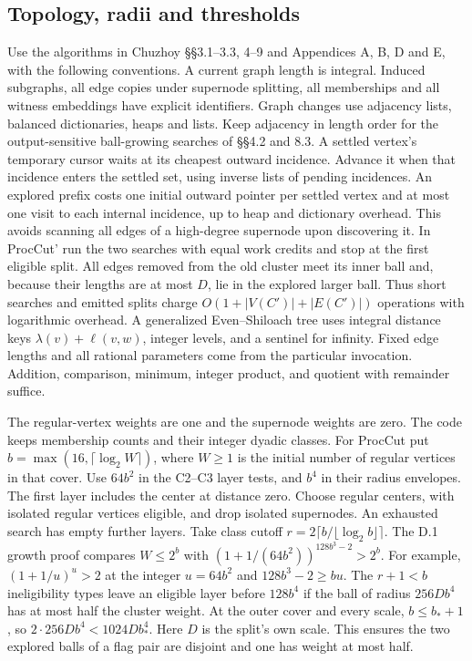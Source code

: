 \documentclass[11pt]{article}
\begin{document}
\hypertarget{topology-radii-and-thresholds}{%
\subsection{Topology, radii and thresholds}\label{topology-radii-and-thresholds}}

Use the algorithms in Chuzhoy §§3.1--3.3, 4--9 and Appendices A, B, D and E, with the following conventions. A current graph length is integral. Induced subgraphs, all edge copies under supernode splitting, all memberships and all witness embeddings have explicit identifiers. Graph changes use adjacency lists, balanced dictionaries, heaps and lists. Keep adjacency in length order for the output-sensitive ball-growing searches of §§4.2 and 8.3. A settled vertex's temporary cursor waits at its cheapest outward incidence. Advance it when that incidence enters the settled set, using inverse lists of pending incidences. An explored prefix costs one initial outward pointer per settled vertex and at most one visit to each internal incidence, up to heap and dictionary overhead. This avoids scanning all edges of a high-degree supernode upon discovering it. In ProcCut' run the two searches with equal work credits and stop at the first eligible split. All edges removed from the old cluster meet its inner ball and, because their lengths are at most \(D\), lie in the explored larger ball. Thus short searches and emitted splits charge \(O(1+|V(C')|+|E(C')|)\) operations with logarithmic overhead. A generalized Even--Shiloach tree uses integral distance keys \(\lambda(v)+\ell(v,w)\), integer levels, and a sentinel for infinity. Fixed edge lengths and all rational parameters come from the particular invocation. Addition, comparison, minimum, integer product, and quotient with remainder suffice.

The regular-vertex weights are one and the supernode weights are zero. The code keeps membership counts and their integer dyadic classes. For ProcCut put \(b=\max(16,\lceil\log_2 W\rceil)\), where \(W\ge1\) is the initial number of regular vertices in that cover. Use \(64b^2\) in the C2--C3 layer tests, and \(b^4\) in their radius envelopes. The first layer includes the center at distance zero. Choose regular centers, with isolated regular vertices eligible, and drop isolated supernodes. An exhausted search has empty further layers. Take class cutoff \(r=2\lceil b/\lfloor\log_2 b\rfloor\rceil\). The D.1 growth proof compares \(W\le 2^b\) with \((1+1/(64b^2))^{128b^3-2}>2^b\). For example, \((1+1/u)^u>2\) at the integer \(u=64b^2\) and \(128b^3-2\ge bu\). The \(r+1<b\) ineligibility types leave an eligible layer before \(128b^4\) if the ball of radius \(256Db^4\) has at most half the cluster weight. At the outer cover and every scale, \(b\le b_*+1\), so \(2\cdot256Db^4<1024Db_*^4\). Here \(D\) is the split's own scale. This ensures the two explored balls of a flag pair are disjoint and one has weight at most half.
\end{document}
